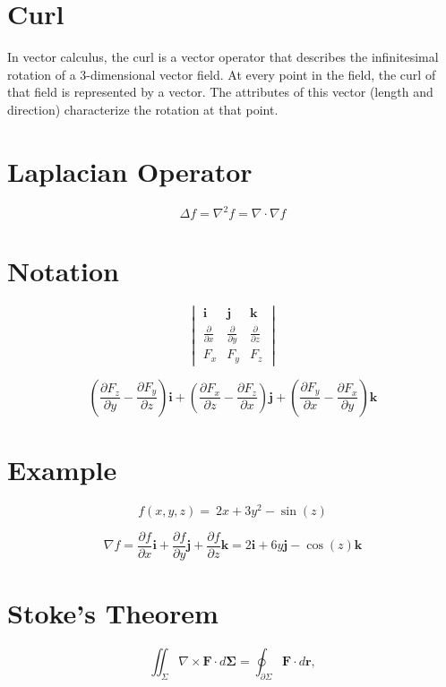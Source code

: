 \documentclass[12pt, a4paper]{article}
\begin{document}
\section{Curl}
In vector calculus, the curl is a vector operator that describes the infinitesimal rotation of a 3-dimensional vector field. At every point in the field, the curl of that field is represented by a vector. The attributes of this vector (length and direction) characterize the rotation at that point.

\section{Laplacian Operator}
\[\Delta f = \nabla^2 f = \nabla \cdot \nabla f\]

\section{Notation}
\[ \begin{vmatrix} \mathbf{i} & \mathbf{j} & \mathbf{k} \\
{\frac{\partial}{\partial x}} & {\frac{\partial}{\partial y}} & {\frac{\partial}{\partial z}} \\
 F_x & F_y & F_z \end{vmatrix}\]

\[\left(\frac{\partial F_z}{\partial y}  - \frac{\partial F_y}{\partial z}\right) \mathbf{i} + \left(\frac{\partial F_x}{\partial z} - \frac{\partial F_z}{\partial x}\right) \mathbf{j} + \left(\frac{\partial F_y}{\partial x} - \frac{\partial F_x}{\partial y}\right) \mathbf{k}\]

\section{Example}
\[f(x,y,z)= \ 2x+3y^2-\sin(z)\]

\[ \nabla f=
\frac{\partial f}{\partial x} \mathbf{i} +
\frac{\partial f}{\partial y} \mathbf{j} +
\frac{\partial f}{\partial z} \mathbf{k}
 = 2\mathbf{i}+ 6y\mathbf{j} -\cos(z)\mathbf{k}\]

\section{Stoke's Theorem}
\[
\iint_{\Sigma} \nabla \times \mathbf{F} \cdot d\mathbf{\Sigma} = \oint_{\partial\Sigma} \mathbf{F} \cdot d \mathbf{r}, \]
\end{document}
